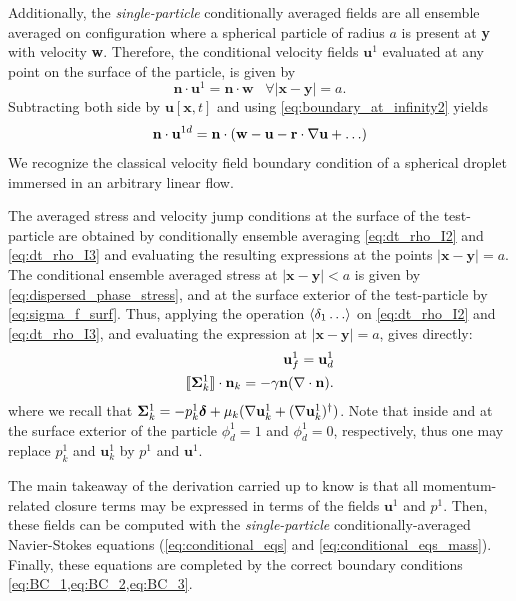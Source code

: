 Additionally, the \textit{single-particle} conditionally averaged fields are all ensemble averaged on configuration where a spherical particle of radius $a$ is present at \textbf{y} with velocity \textbf{w}.
Therefore, the conditional velocity fields $\textbf{u}^1$ evaluated at any point on the surface of the particle, is given by 
\begin{equation}
    \textbf{n}\cdot \textbf{u}^1= \textbf{n} \cdot \textbf{w} \;\;\;\forall |\textbf{x} - \textbf{y}| = a. 
\end{equation}
Subtracting both side by $\textbf{u}[\textbf{x},t]$ and using \ref{eq:boundary_at_infinity2} yields
\begin{equation}
    \textbf{n}\cdot\textbf{u}^{1d}
    = \textbf{n}\cdot(
    \textbf{w} 
    - \textbf{u}
    -\textbf{r} \cdot \grad\textbf{u} 
    + \ldots
    )
    \label{eq:BC_1}
\end{equation}
We recognize the classical velocity field boundary condition of a spherical droplet immersed in an arbitrary linear flow. 

The averaged stress and velocity jump conditions at the surface of the test-particle are obtained by conditionally ensemble averaging \ref{eq:dt_rho_I2} and \ref{eq:dt_rho_I3} and evaluating the resulting expressions at the points $|\textbf{x}-\textbf{y}| =a$. 
The conditional ensemble averaged stress at $|\textbf{x}-\textbf{y}| < a$ is given by \eqref{eq:dispersed_phase_stress}, and at the surface exterior of the test-particle by \ref{eq:sigma_f_surf}. 
Thus, applying the operation $\left<\delta_1 \ldots\right>$ on \ref{eq:dt_rho_I2} and \ref{eq:dt_rho_I3}, and evaluating the expression at $|\textbf{x}-\textbf{y}| =a$, gives directly:  
\begin{align}
    \label{eq:BC_2}
    \textbf{u}_f^1 = \textbf{u}_d^1\\
    \Jump{\bm{\Sigma}_k^1} 
    =
    - \gamma\textbf{n}(\div \textbf{n}). 
    \label{eq:BC_3}
\end{align}
where we recall that $\bm{\Sigma}_k^1 = -p_k^1\bm\delta + \mu_k (\mathbf{\nabla} \textbf{u}_k^1 + (\mathbf{\nabla} \textbf{u}_k^1)^\dagger)$. 
Note that inside and at the surface exterior of the particle $\phi_d^1 = 1$ and $\phi_d^1 =0$, respectively, thus one may replace $p_k^1$ and $\textbf{u}_k^1$ by $p^1$ and $\textbf{u}^1$. 



The main takeaway of the derivation carried up to know is that all momentum-related closure terms may be expressed in terms of the fields $\textbf{u}^1$ and $p^1$. 
Then, these fields can be computed with the \textit{single-particle} conditionally-averaged Navier-Stokes equations (\ref{eq:conditional_eqs} and \ref{eq:conditional_eqs_mass}). 
Finally, these equations are completed by the correct boundary conditions \ref{eq:BC_1,eq:BC_2,eq:BC_3}. 

